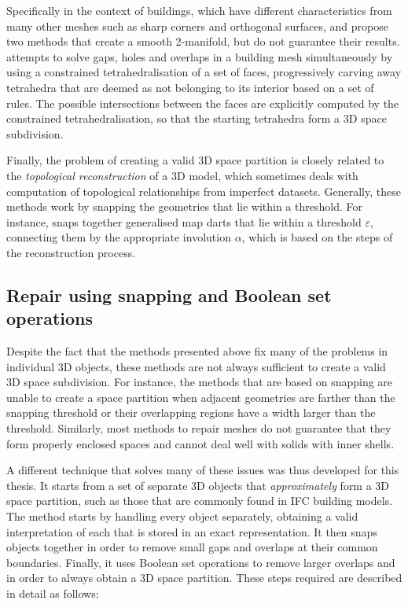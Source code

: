 Specifically in the context of buildings, which have different characteristics from many other meshes such as sharp corners and orthogonal surfaces, \citet{Bogdahn10} and \citet{Alam13} propose two methods that create a smooth 2-manifold, but do not guarantee their results.
\citet{Zhao14} attempts to solve gaps, holes and overlaps in a building mesh simultaneously by using a constrained tetrahedralisation \citep{Si05} of a set of faces, progressively carving away tetrahedra that are deemed as not belonging to its interior based on a set of rules.
The possible intersections between the faces are explicitly computed by the constrained tetrahedralisation, so that the starting tetrahedra form a 3D space subdivision.

Finally, the problem of creating a valid 3D space partition is closely related to the \emph{topological reconstruction} of a 3D model, which sometimes deals with computation of topological relationships from imperfect datasets.
Generally, these methods work by snapping the geometries that lie within a threshold.
For instance, \citet{Horna06} snaps together generalised map darts that lie within a threshold $\varepsilon$, connecting them by the appropriate involution $\alpha$, which is based on the steps of the reconstruction process.

\subsection{Repair using snapping and Boolean set operations}

Despite the fact that the methods presented above fix many of the problems in individual 3D objects, these methods are not always sufficient to create a valid 3D space subdivision.
For instance, the methods that are based on snapping are unable to create a space partition when adjacent geometries are farther than the snapping threshold or their overlapping regions have a width larger than the threshold.
Similarly, most methods to repair meshes do not guarantee that they form properly enclosed spaces and cannot deal well with solids with inner shells.

A different technique that solves many of these issues was thus developed for this thesis.
It starts from a set of separate 3D objects that \emph{approximately} form a 3D space partition, such as those that are commonly found in IFC building models.
The method starts by handling every object separately, obtaining a valid interpretation of each that is stored in an exact representation.
It then snaps objects together in order to remove small gaps and overlaps at their common boundaries.
Finally, it uses Boolean set operations to remove larger overlaps and in order to always obtain a 3D space partition.
These steps required are described in detail as follows:

